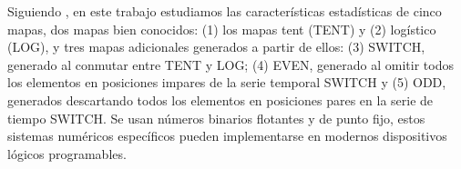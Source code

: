 Siguiendo \cite{Nagaraj2008}, en este trabajo estudiamos las características estadísticas de cinco mapas, dos mapas bien conocidos: (1) los mapas tent (TENT) y (2) logístico (LOG), y tres mapas adicionales generados a partir de ellos: (3) SWITCH, generado al conmutar entre TENT y LOG; (4) EVEN, generado al omitir todos los elementos en posiciones impares de la serie temporal SWITCH y (5) ODD, generados descartando todos los elementos en posiciones pares en la serie de tiempo SWITCH.
Se usan números binarios flotantes y de punto fijo, estos sistemas numéricos específicos pueden implementarse en modernos dispositivos lógicos programables.